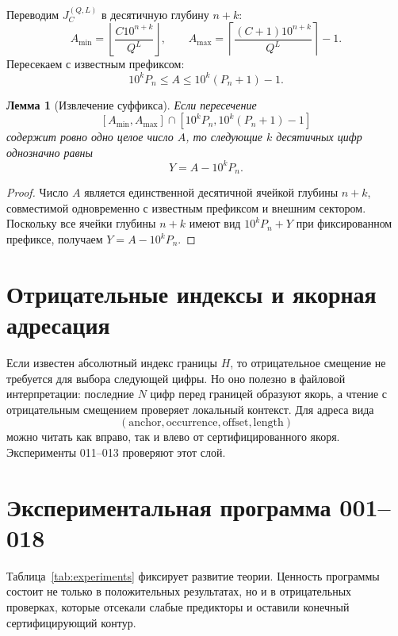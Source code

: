 \documentclass[11pt,a4paper]{article}
\newtheorem{lemma}{Лемма}
\begin{document}
Переводим $J_C^{(Q,L)}$ в десятичную глубину $n+k$:
\[
  A_{\min}=\left\lfloor\frac{C10^{n+k}}{Q^L}\right\rfloor,
  \qquad
  A_{\max}=\left\lceil\frac{(C+1)10^{n+k}}{Q^L}\right\rceil-1.
\]
Пересекаем с известным префиксом:
\[
  10^kP_n\le A\le 10^k(P_n+1)-1.
\]

\begin{lemma}[Извлечение суффикса]
Если пересечение
\[
  [A_{\min},A_{\max}]
  \cap
  [10^kP_n,10^k(P_n+1)-1]
\]
содержит ровно одно целое число $A$, то следующие $k$ десятичных цифр однозначно равны
\[
  \boxed{Y=A-10^kP_n.}
\]
\end{lemma}

\begin{proof}
Число $A$ является единственной десятичной ячейкой глубины $n+k$, совместимой одновременно с известным префиксом и внешним сектором.  Поскольку все ячейки глубины $n+k$ имеют вид $10^kP_n+Y$ при фиксированном префиксе, получаем $Y=A-10^kP_n$.
\end{proof}

\section{Отрицательные индексы и якорная адресация}

Если известен абсолютный индекс границы $H$, то отрицательное смещение не требуется для выбора следующей цифры.  Но оно полезно в файловой интерпретации: последние $N$ цифр перед границей образуют якорь, а чтение с отрицательным смещением проверяет локальный контекст.  Для адреса вида
\[
  (\text{anchor},\text{occurrence},\text{offset},\text{length})
\]
можно читать как вправо, так и влево от сертифицированного якоря.  Эксперименты 011--013 проверяют этот слой.

\section{Экспериментальная программа 001--018}

Таблица~\ref{tab:experiments} фиксирует развитие теории.  Ценность программы состоит не только в положительных результатах, но и в отрицательных проверках, которые отсекали слабые предикторы и оставили конечный сертифицирующий контур.
\end{document}
